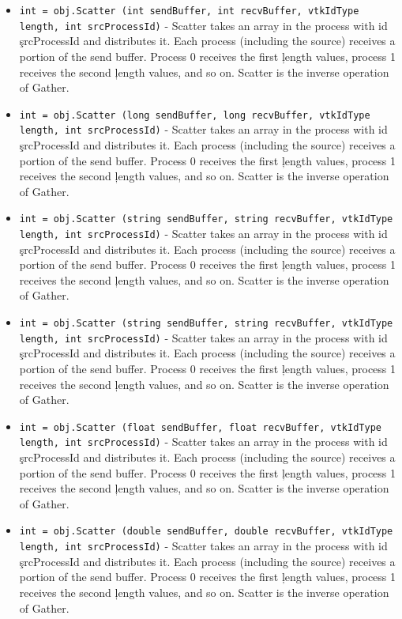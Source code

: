 \begin{itemize}
\item  \verb|int = obj.Scatter (int sendBuffer, int recvBuffer, vtkIdType length, int srcProcessId)| -  Scatter takes an array in the process with id \c srcProcessId and
 distributes it.  Each process (including the source) receives a portion of
 the send buffer.  Process 0 receives the first \c length values, process 1
 receives the second \c length values, and so on.  Scatter is the inverse
 operation of Gather.

\item  \verb|int = obj.Scatter (long sendBuffer, long recvBuffer, vtkIdType length, int srcProcessId)| -  Scatter takes an array in the process with id \c srcProcessId and
 distributes it.  Each process (including the source) receives a portion of
 the send buffer.  Process 0 receives the first \c length values, process 1
 receives the second \c length values, and so on.  Scatter is the inverse
 operation of Gather.

\item  \verb|int = obj.Scatter (string sendBuffer, string recvBuffer, vtkIdType length, int srcProcessId)| -  Scatter takes an array in the process with id \c srcProcessId and
 distributes it.  Each process (including the source) receives a portion of
 the send buffer.  Process 0 receives the first \c length values, process 1
 receives the second \c length values, and so on.  Scatter is the inverse
 operation of Gather.

\item  \verb|int = obj.Scatter (string sendBuffer, string recvBuffer, vtkIdType length, int srcProcessId)| -  Scatter takes an array in the process with id \c srcProcessId and
 distributes it.  Each process (including the source) receives a portion of
 the send buffer.  Process 0 receives the first \c length values, process 1
 receives the second \c length values, and so on.  Scatter is the inverse
 operation of Gather.

\item  \verb|int = obj.Scatter (float sendBuffer, float recvBuffer, vtkIdType length, int srcProcessId)| -  Scatter takes an array in the process with id \c srcProcessId and
 distributes it.  Each process (including the source) receives a portion of
 the send buffer.  Process 0 receives the first \c length values, process 1
 receives the second \c length values, and so on.  Scatter is the inverse
 operation of Gather.

\item  \verb|int = obj.Scatter (double sendBuffer, double recvBuffer, vtkIdType length, int srcProcessId)| -  Scatter takes an array in the process with id \c srcProcessId and
 distributes it.  Each process (including the source) receives a portion of
 the send buffer.  Process 0 receives the first \c length values, process 1
 receives the second \c length values, and so on.  Scatter is the inverse
 operation of Gather.


\end{itemize}
